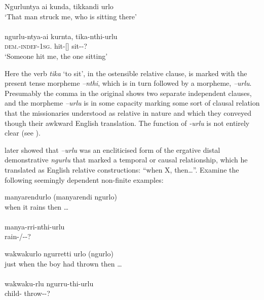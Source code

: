 \ea\label{ex:5:31}
Ngurluntya      ai                   kunda,           tikkandi	urlo \\
\glt `That man struck me, who is sitting there' \\
\citep[13]{teichelmann_outlines_1840} \\
\gll ngurlu-ntya-ai		 kurnta,          tika-nthi-urlu \\
\textsc{dem}.-\textsc{indef}-1\textsc{sg}.    hit-[]    sit--?\\
\glt `Someone hit me, the one sitting'
\z


Here the verb \textit{tika} `to sit', in the ostensible relative clause, is marked with the present tense morpheme \textit{–nthi}, which is in turn followed by a morpheme, \textit{–urlu}. Presumably the comma in the original shows two separate independent clauses, and the morpheme \textit{–urlu} is in some capacity marking some sort of clausal relation that the missionaries understood as relative in nature and which they conveyed though their awkward English translation. The function of \textit{-urlu} is not entirely clear (see \citealt[191--192]{amery_kulurdu_2013}).

\citet{teichelmann_verb_1858} later showed that \textit{–urlu} was an encliticised form of the ergative distal demonstrative \textit{ngurlu} \citep[9]{teichelmann_outlines_1840} that marked a temporal or causal relationship, which he translated as English relative constructions: ``when X, then…''. Examine the following seemingly dependent non-finite examples: 

\ea\label{ex:5:32}
manyarendurlo (manyarendi ngurlo) \\
when it rains then …  \\
\citep{teichelmann_verb_1858} \\
\gll manya-rri-nthi-urlu \\
rain-/--?                        \\
\z

\ea\label{ex:5:33}
wakwakurlo ngurretti urlo (ngurlo) \\
\glt just when the boy had thrown then … \\
\citep{teichelmann_verb_1858} \\
\gll wakwaku-rlu     ngurru-thi-urlu \\
child-         throw--?                    \\
\z

